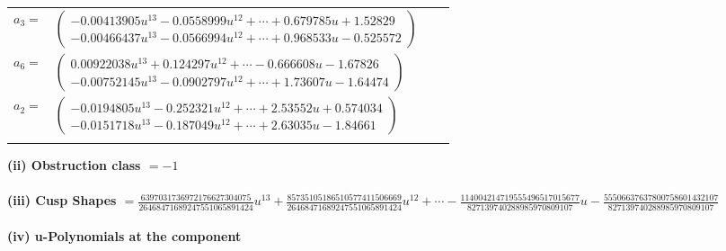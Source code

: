 \documentclass[1p]{elsarticle_modified}
\theoremstyle{definition}
\begin{document}
\begin{tabular}{m{7pt} m{180pt} m{7pt} m{180pt} }
\flushright $a_{3}=$&$\begin{pmatrix}-0.00413905 u^{13}-0.0558999 u^{12}+\cdots+0.679785 u+1.52829\\-0.00466437 u^{13}-0.0566994 u^{12}+\cdots+0.968533 u-0.525572\end{pmatrix}$ \\
\flushright $a_{6}=$&$\begin{pmatrix}0.00922038 u^{13}+0.124297 u^{12}+\cdots-0.666608 u-1.67826\\-0.00752145 u^{13}-0.0902797 u^{12}+\cdots+1.73607 u-1.64474\end{pmatrix}$ \\
\flushright $a_{2}=$&$\begin{pmatrix}-0.0194805 u^{13}-0.252321 u^{12}+\cdots+2.53552 u+0.574034\\-0.0151718 u^{13}-0.187049 u^{12}+\cdots+2.63035 u-1.84661\end{pmatrix}$\\&\end{tabular}
\flushleft \textbf{(ii) Obstruction class $= -1$}\\~\\
\flushleft \textbf{(iii) Cusp Shapes $= \frac{6397031736972176627304075}{26468471689247551065891424} u^{13}+\frac{85735105186510577411506669}{26468471689247551065891424} u^{12}+\cdots-\frac{114004214719555496517015677}{827139740288985970809107} u-\frac{55506637637800758601432107}{827139740288985970809107}$}\\~\\
\newpage\renewcommand{\arraystretch}{1}
\flushleft \textbf{(iv) u-Polynomials at the component}\newline \\
\end{document}
